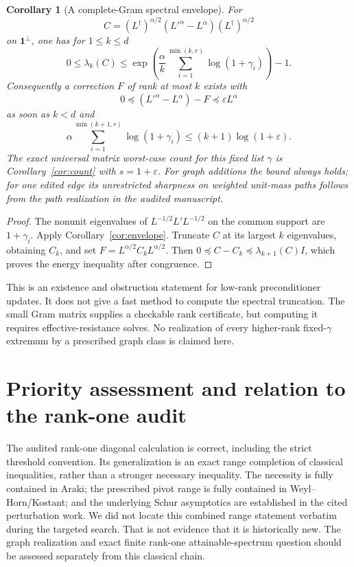 \documentclass[11pt]{article}
\newtheorem{corollary}[theorem]{Corollary}
\begin{document}
\begin{corollary}[A complete-Gram spectral envelope]\label{cor:graph}
For
\[
 C=(L^\dagger)^{\alpha/2}(L'^\alpha-L^\alpha)
      (L^\dagger)^{\alpha/2}
\]
on $\mathbf1^\perp$, one has for $1\le k\le d$
\[
 0\le\lambda_k(C)
 \le\exp\left(\frac\alpha k
      \sum_{i=1}^{\min(k,r)}\log(1+\gamma_i)\right)-1.
\]
Consequently a correction $F$ of rank at most $k$ exists with
\[
 0\preceq (L'^\alpha-L^\alpha)-F\preceq\varepsilon L^\alpha
\]
as soon as $k<d$ and
\[
 \alpha\sum_{i=1}^{\min(k+1,r)}\log(1+\gamma_i)
 \le(k+1)\log(1+\varepsilon).
\]
The exact universal matrix worst-case count for this fixed list
$\gamma$ is Corollary~\ref{cor:count} with $s=1+\varepsilon$.
For graph additions the bound always holds; for one edited edge its
unrestricted sharpness on weighted unit-mass paths follows from the
path realization in the audited manuscript.
\end{corollary}
\begin{proof}
The nonunit eigenvalues of $L^{-1/2}L'L^{-1/2}$ on the common support
are $1+\gamma_i$. Apply Corollary~\ref{cor:envelope}.
Truncate $C$ at its largest $k$ eigenvalues, obtaining $C_k$,
and set $F=L^{\alpha/2}C_kL^{\alpha/2}$.
Then $0\preceq C-C_k\preceq\lambda_{k+1}(C)I$, which proves the
energy inequality after congruence.
\end{proof}

This is an existence and obstruction statement for low-rank
preconditioner updates. It does not give a fast method to compute the
spectral truncation. The small Gram matrix supplies a checkable rank
certificate, but computing it requires effective-resistance solves.
No realization of every higher-rank fixed-$\gamma$ extremum by a
prescribed graph class is claimed here.

\section{Priority assessment and relation to the rank-one audit}
The audited rank-one diagonal calculation is correct, including the
strict threshold convention. Its generalization is an exact range
completion of classical inequalities, rather than a stronger necessary
inequality. The necessity is fully contained in Araki; the prescribed
pivot range is fully contained in Weyl--Horn/Kostant; and the underlying
Schur asymptotics are established in the cited perturbation work.
We did not locate this combined range statement verbatim during the
targeted search. That is not evidence that it is historically new.
The graph realization and exact finite rank-one attainable-spectrum
question should be assessed separately from this classical chain.
\end{document}
